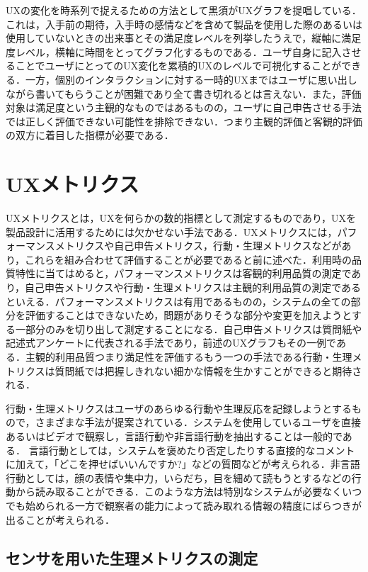 UXの変化を時系列で捉えるための方法として黒須がUXグラフ\cite{kurosu2015}を提唱している．これは，入手前の期待，入手時の感情などを含めて製品を使用した際のあるいは使用していないときの出来事とその満足度レベルを列挙したうえで，縦軸に満足度レベル，横軸に時間をとってグラフ化するものである．ユーザ自身に記入させることでユーザにとってのUX変化を累積的UXのレベルで可視化することができる．一方，個別のインタラクションに対する一時的UXまではユーザに思い出しながら書いてもらうことが困難であり全て書き切れるとは言えない．また，評価対象は満足度という主観的なものではあるものの，ユーザに自己申告させる手法では正しく評価できない可能性を排除できない．つまり主観的評価と客観的評価の双方に着目した指標が必要である．

\section{UXメトリクス}

UXメトリクスとは，UXを何らかの数的指標として測定するものであり，UXを製品設計に活用するためには欠かせない手法である．UXメトリクスには，パフォーマンスメトリクスや自己申告メトリクス，行動・生理メトリクスなどがあり\cite{tullis2014}，これらを組み合わせて評価することが必要であると前に述べた．利用時の品質特性に当てはめると，パフォーマンスメトリクスは客観的利用品質の測定であり，自己申告メトリクスや行動・生理メトリクスは主観的利用品質の測定であるといえる．パフォーマンスメトリクスは有用であるものの，システムの全ての部分を評価することはできないため，問題がありそうな部分や変更を加えようとする一部分のみを切り出して測定することになる．自己申告メトリクスは質問紙や記述式アンケートに代表される手法であり，前述のUXグラフもその一例である．主観的利用品質つまり満足性を評価するもう一つの手法である行動・生理メトリクスは質問紙では把握しきれない細かな情報を生かすことができると期待される．

行動・生理メトリクスはユーザのあらゆる行動や生理反応を記録しようとするもので，さまざまな手法が提案されている．システムを使用しているユーザを直接あるいはビデオで観察し，言語行動や非言語行動を抽出することは一般的である．
言語行動としては，システムを褒めたり否定したりする直接的なコメントに加えて，「どこを押せばいいんですか?」などの質問などが考えられる．非言語行動としては，顔の表情や集中力，いらだち，目を細めて読もうとするなどの行動から読み取ることができる．このような方法は特別なシステムが必要なくいつでも始められる一方で観察者の能力によって読み取れる情報の精度にばらつきが出ることが考えられる．

\subsection{センサを用いた生理メトリクスの測定}

